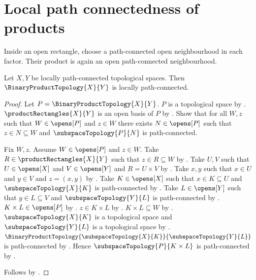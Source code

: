 \section{Local path connectedness of products}





Inside an open rectangle, choose a path-connected open neighbourhood in each
factor. Their product is again an open path-connected neighbourhood.

\begin{theorem}\label{binary_product_of_locally_path_connected_spaces}
    Let $X,Y$ be locally path-connected topological spaces.
    Then $\BinaryProductTopology{X}{Y}$ is locally path-connected.
\end{theorem}
\begin{proof}
    Let $P=\BinaryProductTopology{X}{Y}$.
    $P$ is a topological space by .
    $\productRectangles{X}{Y}$ is an open basis of $P$ by
        .
    Show that for all $W,z$ such that $W\in\opens[P]$ and $z\in W$ there exists
        $N\in\opens[P]$ such that $z\in N\subseteq W$ and
        $\subspaceTopology{P}{N}$ is path-connected.
    \begin{subproof}
        Fix $W,z$.
        Assume $W\in\opens[P]$ and $z\in W$.
        Take $R\in\productRectangles{X}{Y}$ such that $z\in R\subseteq W$ by .
        Take $U,V$ such that $U\in\opens[X]$ and $V\in\opens[Y]$ and $R=U\times V$ by
            .
        Take $x,y$ such that $x\in U$ and $y\in V$ and $z=(x,y)$ by .
        Take $K\in\opens[X]$ such that $x\in K\subseteq U$ and
            $\subspaceTopology{X}{K}$ is path-connected by .
        Take $L\in\opens[Y]$ such that $y\in L\subseteq V$ and
            $\subspaceTopology{Y}{L}$ is path-connected by .
        $K\times L\in\opens[P]$ by .
        $z\in K\times L$ by .
        $K\times L\subseteq W$ by .
        $\subspaceTopology{X}{K}$ is a topological space and
            $\subspaceTopology{Y}{L}$ is a topological space by
            .
        $\BinaryProductTopology{\subspaceTopology{X}{K}}{\subspaceTopology{Y}{L}}$
            is path-connected by .
        Hence $\subspaceTopology{P}{K\times L}$ is path-connected by .
    \end{subproof}
    Follows by .
\end{proof}
